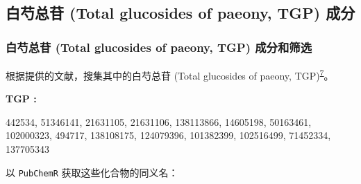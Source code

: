 \documentclass[
]{article}
\begin{document}
\hypertarget{ux767dux828dux603bux82f7-total-glucosides-of-paeony-tgp-ux6210ux5206}{%
\subsection{白芍总苷 (Total glucosides of paeony, TGP) 成分}\label{ux767dux828dux603bux82f7-total-glucosides-of-paeony-tgp-ux6210ux5206}}

\hypertarget{ux767dux828dux603bux82f7-total-glucosides-of-paeony-tgp-ux6210ux5206ux548cux7b5bux9009}{%
\subsubsection{白芍总苷 (Total glucosides of paeony, TGP) 成分和筛选}\label{ux767dux828dux603bux82f7-total-glucosides-of-paeony-tgp-ux6210ux5206ux548cux7b5bux9009}}

根据提供的文献，搜集其中的白芍总苷 (Total glucosides of paeony, TGP)\textsuperscript{\protect\hyperlink{ref-TotalGlucosideJiang2020}{7}}。

\begin{center}\begin{tcolorbox}[colback=gray!10, colframe=gray!50, width=0.9\linewidth, arc=1mm, boxrule=0.5pt]
\textbf{
TGP
:}

\vspace{0.5em}

    442534, 51346141, 21631105, 21631106, 138113866,
14605198, 50163461, 102000323, 494717, 138108175,
124079396, 101382399, 102516499, 71452334, 137705343

\vspace{2em}
\end{tcolorbox}
\end{center}

以 \texttt{PubChemR} 获取这些化合物的同义名：
\end{document}

